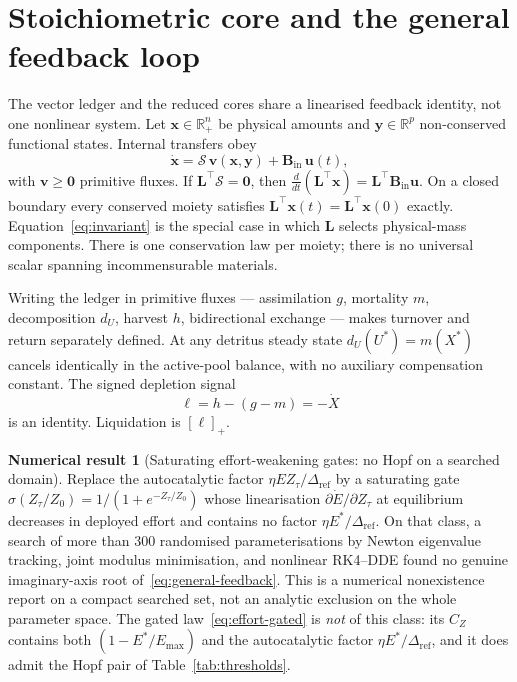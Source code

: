 \documentclass[11pt]{article}
\theoremstyle{definition}
\newtheorem{numresult}{Numerical result}
\begin{document}
\section{Stoichiometric core and the general feedback loop}
\label{sec:unified-core}

The vector ledger and the reduced cores share a linearised feedback identity, not one nonlinear system. Let $\mathbf x\in\mathbb R_+^n$ be physical amounts and $\mathbf y\in\mathbb R^p$ non-conserved functional states. Internal transfers obey
\begin{equation}
\dot{\mathbf x}=\mathcal S\,\mathbf v(\mathbf x,\mathbf y)+\mathbf B_{\mathrm{in}}\,\mathbf u(t),
\label{eq:unified-stoich}
\end{equation}
with $\mathbf v\ge\mathbf 0$ primitive fluxes. If $\mathbf L^\top\mathcal S=\mathbf 0$, then $\frac{d}{dt}(\mathbf L^\top\mathbf x)=\mathbf L^\top\mathbf B_{\mathrm{in}}\mathbf u$. On a closed boundary every conserved moiety satisfies $\mathbf L^\top\mathbf x(t)=\mathbf L^\top\mathbf x(0)$ exactly. Equation~\eqref{eq:invariant} is the special case in which $\mathbf L$ selects physical-mass components. There is one conservation law per moiety; there is no universal scalar spanning incommensurable materials.

Writing the ledger in primitive fluxes --- assimilation $g$, mortality $m$, decomposition $d_U$, harvest $h$, bidirectional exchange --- makes turnover and return separately defined. At any detritus steady state $d_U(U^*)=m(X^*)$ cancels identically in the active-pool balance, with no auxiliary compensation constant. The signed depletion signal
\begin{equation}
\ell=h-(g-m)=-\dot X
\label{eq:unified-ell}
\end{equation}
is an identity. Liquidation is $[\ell]_+$.

\begin{numresult}[Saturating effort-weakening gates: no Hopf on a searched domain]
\label{thm:sigma-gate}
Replace the autocatalytic factor $\eta E Z_\tau/\Delta_{\mathrm{ref}}$ by a saturating gate $\sigma(Z_\tau/Z_0)=1/(1+e^{-Z_\tau/Z_0})$ whose linearisation $\partial\dot E/\partial Z_\tau$ at equilibrium decreases in deployed effort and contains no factor $\eta E^*/\Delta_{\mathrm{ref}}$. On that class, a search of more than $300$ randomised parameterisations by Newton eigenvalue tracking, joint modulus minimisation, and nonlinear RK4--DDE found no genuine imaginary-axis root of~\eqref{eq:general-feedback}. This is a numerical nonexistence report on a compact searched set, not an analytic exclusion on the whole parameter space. The gated law~\eqref{eq:effort-gated} is \emph{not} of this class: its $C_Z$ contains both $(1-E^*/E_{\max})$ and the autocatalytic factor $\eta E^*/\Delta_{\mathrm{ref}}$, and it does admit the Hopf pair of Table~\ref{tab:thresholds}.
\end{numresult}
\end{document}
